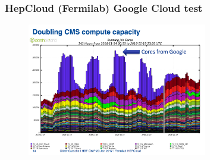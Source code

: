 \begin{frame}
\frametitle{HepCloud (Fermilab) Google Cloud test}

\begin{figure}[htbp]
\begin{center}
\includegraphics[width=0.7\textwidth]{images/hepcloud-google.png}
\end{center}
\end{figure}

\end{frame}


